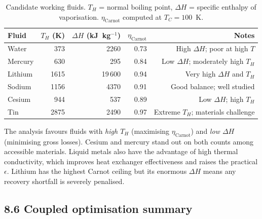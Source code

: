 \documentclass[12pt]{article}
\begin{document}
\begin{table}[h]
\centering
\caption{Candidate working fluids. $T_H$ = normal boiling point,
$\Delta H$ = specific enthalpy of vaporisation.
$\eta_{\mathrm{Carnot}}$ computed at $T_C = 100$~K.
\label{tab:fluids}}
\begin{tabular}{lrrrr}
\toprule
\textbf{Fluid} & $T_H$ (K) & $\Delta H$ (kJ~kg$^{-1}$) & $\eta_{\mathrm{Carnot}}$ & Notes \\
\midrule
Water          & 373  & 2260 & 0.73 & High $\Delta H$; poor at high $T$ \\
Mercury        & 630  & 295  & 0.84 & Low $\Delta H$; moderately high $T_H$ \\
Lithium        & 1615 & 19\,600 & 0.94 & Very high $\Delta H$ and $T_H$ \\
Sodium         & 1156 & 4370 & 0.91 & Good balance; well studied \\
Cesium         & 944  & 537  & 0.89 & Low $\Delta H$; high $T_H$ \\
Tin            & 2875 & 2490 & 0.97 & Extreme $T_H$; materials challenge \\
\bottomrule
\end{tabular}
\end{table}

\noindent
The analysis favours fluids with \emph{high $T_H$} (maximising $\eta_{\mathrm{Carnot}}$)
and \emph{low $\Delta H$} (minimising gross losses). Cesium and mercury stand out
on both counts among accessible materials. Liquid metals also have the advantage of
high thermal conductivity, which improves heat exchanger effectiveness and raises
the practical $\epsilon$. Lithium has the highest Carnot ceiling but its enormous
$\Delta H$ means any recovery shortfall is severely penalised.

\subsection*{8.6 Coupled optimisation summary}
\end{document}
